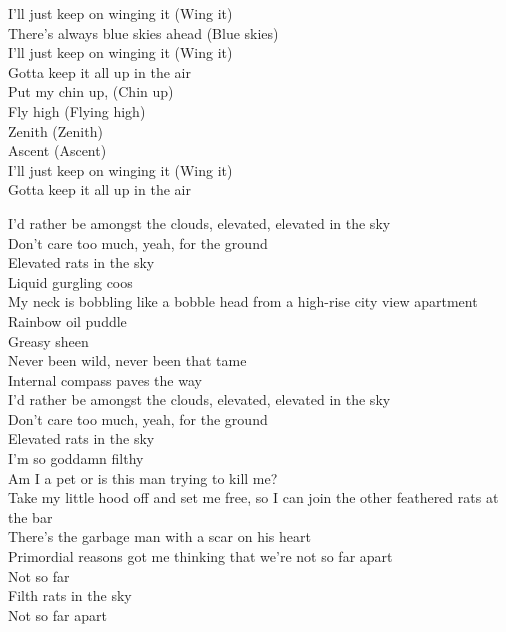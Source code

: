 I'll just keep on winging it (Wing it) \\
There's always blue skies ahead (Blue skies) \\
I'll just keep on winging it (Wing it) \\
Gotta keep it all up in the air \\
Put my chin up, (Chin up) \\
Fly high (Flying high) \\
Zenith (Zenith) \\
Ascent (Ascent) \\
I'll just keep on winging it (Wing it) \\
Gotta keep it all up in the air \\



I'd rather be amongst the clouds, elevated, elevated in the sky \\
Don't care too much, yeah, for the ground \\
Elevated rats in the sky \\
Liquid gurgling coos \\
My neck is bobbling like a bobble head from a high-rise city view apartment \\
Rainbow oil puddle \\
Greasy sheen \\
Never been wild, never been that tame \\
Internal compass paves the way \\
I'd rather be amongst the clouds, elevated, elevated in the sky \\
Don't care too much, yeah, for the ground \\
Elevated rats in the sky \\

I'm so goddamn filthy \\
Am I a pet or is this man trying to kill me? \\
Take my little hood off and set me free, so I can join the other feathered rats at the bar \\
There's the garbage man with a scar on his heart \\
Primordial reasons got me thinking that we're not so far apart \\
Not so far \\
Filth rats in the sky \\
Not so far apart \\

